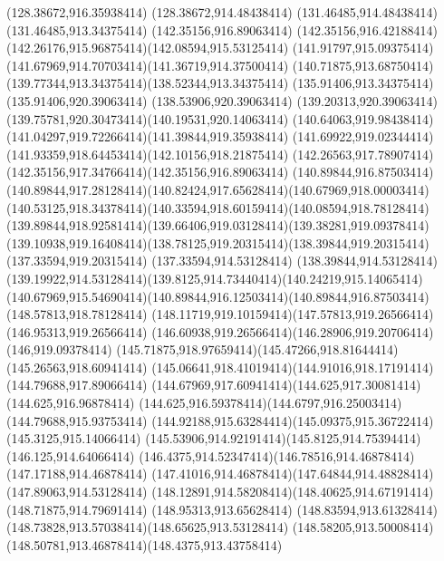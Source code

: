 {{	\lineto(128.38672,916.35938414)
	\lineto(128.38672,914.48438414)
	\lineto(131.46485,914.48438414)
	\lineto(131.46485,913.34375414)
	\closepath
	\moveto(142.35156,916.89063414)
	\curveto(142.35156,916.42188414)(142.26176,915.96875414)(142.08594,915.53125414)
	\curveto(141.91797,915.09375414)(141.67969,914.70703414)(141.36719,914.37500414)
	\curveto(140.71875,913.68750414)(139.77344,913.34375414)(138.52344,913.34375414)
	\lineto(135.91406,913.34375414)
	\lineto(135.91406,920.39063414)
	\lineto(138.53906,920.39063414)
	\curveto(139.20313,920.39063414)(139.75781,920.30473414)(140.19531,920.14063414)
	\curveto(140.64063,919.98438414)(141.04297,919.72266414)(141.39844,919.35938414)
	\curveto(141.69922,919.02344414)(141.93359,918.64453414)(142.10156,918.21875414)
	\curveto(142.26563,917.78907414)(142.35156,917.34766414)(142.35156,916.89063414)
	\closepath
	\moveto(140.89844,916.87503414)
	\curveto(140.89844,917.28128414)(140.82424,917.65628414)(140.67969,918.00003414)
	\curveto(140.53125,918.34378414)(140.33594,918.60159414)(140.08594,918.78128414)
	\curveto(139.89844,918.92581414)(139.66406,919.03128414)(139.38281,919.09378414)
	\curveto(139.10938,919.16408414)(138.78125,919.20315414)(138.39844,919.20315414)
	\lineto(137.33594,919.20315414)
	\lineto(137.33594,914.53128414)
	\lineto(138.39844,914.53128414)
	\curveto(139.19922,914.53128414)(139.8125,914.73440414)(140.24219,915.14065414)
	\curveto(140.67969,915.54690414)(140.89844,916.12503414)(140.89844,916.87503414)
	\closepath
	\moveto(148.57813,918.78128414)
	\curveto(148.11719,919.10159414)(147.57813,919.26566414)(146.95313,919.26566414)
	\curveto(146.60938,919.26566414)(146.28906,919.20706414)(146,919.09378414)
	\curveto(145.71875,918.97659414)(145.47266,918.81644414)(145.26563,918.60941414)
	\curveto(145.06641,918.41019414)(144.91016,918.17191414)(144.79688,917.89066414)
	\curveto(144.67969,917.60941414)(144.625,917.30081414)(144.625,916.96878414)
	\curveto(144.625,916.59378414)(144.6797,916.25003414)(144.79688,915.93753414)
	\curveto(144.92188,915.63284414)(145.09375,915.36722414)(145.3125,915.14066414)
	\curveto(145.53906,914.92191414)(145.8125,914.75394414)(146.125,914.64066414)
	\curveto(146.4375,914.52347414)(146.78516,914.46878414)(147.17188,914.46878414)
	\curveto(147.41016,914.46878414)(147.64844,914.48828414)(147.89063,914.53128414)
	\curveto(148.12891,914.58208414)(148.40625,914.67191414)(148.71875,914.79691414)
	\lineto(148.95313,913.65628414)
	\curveto(148.83594,913.61328414)(148.73828,913.57038414)(148.65625,913.53128414)
	\curveto(148.58205,913.50008414)(148.50781,913.46878414)(148.4375,913.43758414)
}}
